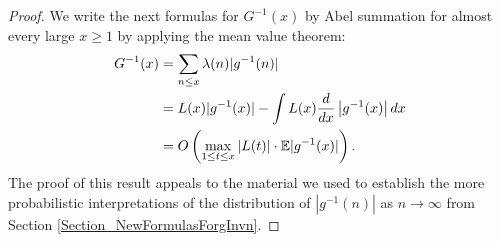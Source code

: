 \documentclass[11pt,reqno,a4letter]{article}
\numberwithin{figure}{section}
\numberwithin{table}{section}
\theoremstyle{plain}
\numberwithin{theorem}{section}
\theoremstyle{definition}
\begin{document}
\begin{proof} 
We write the next formulas for $G^{-1}(x)$ by Abel summation 
for almost every large $x \geq 1$ by applying the mean value theorem: 
\begin{align} 
\notag 
G^{-1}(x) & = \sum_{n \leq x} \lambda(n) |g^{-1}(n)| \\ 
\notag
     & = L(x) |g^{-1}(x)| - \int L(x) \frac{d}{dx}\left\lvert g^{-1}(x) \right\rvert dx \\ 
\label{proof_tag_GInvx_LxAbelSummationIntFormula_v1} 
     & = O\left(\max_{1 \leq t \leq x} |L(t)| \cdot \mathbb{E}|g^{-1}(x)|\right). 
\end{align} 
The proof of this result appeals to the 
material we used to establish the 
more probabilistic interpretations of the distribution of $|g^{-1}(n)|$ as 
$n \rightarrow \infty$ from 
Section \ref{Section_NewFormulasForgInvn}. 


\end{proof}
\end{document}
